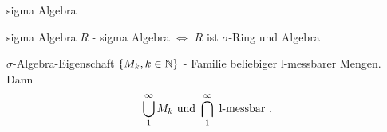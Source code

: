 \documentclass[class=article, crop=false]{standalone}
\begin{document}
\begin{zettel}{sigma Algebra}

\begin{flashcard}[5swvsajw]{sigma Algebra}
	$R$ - sigma Algebra $\iff$  $R$ ist $\sigma$-Ring und Algebra
\end{flashcard}

\begin{flashcard}[5cmw2k6n]{$\sigma$-Algebra-Eigenschaft}
	$\set{M_k, k \in \N }$ - Familie beliebiger l-messbarer Mengen. Dann
	\[
		\bigcup_1^{\infty} M_k \text{ und } \bigcap_1^{\infty} \text{ l-messbar }
	.\]
\end{flashcard}

\end{zettel}
\end{document}
